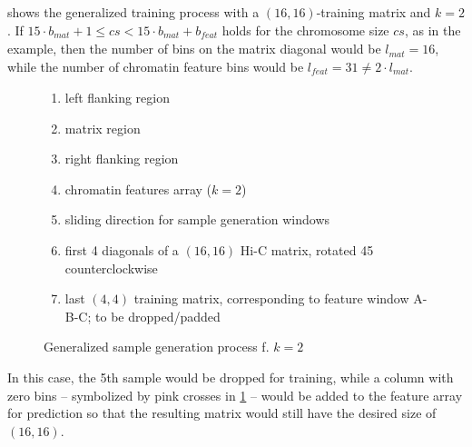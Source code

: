  shows the generalized training process with a $(16, 16)$-training matrix and $k=2$. 
If  $15\cdot b_\mathit{mat} + 1 \leq cs < 15\cdot b_\mathit{mat} + b_\mathit{feat}$ holds for the chromosome size $cs$, as in the example,
then the number of bins on the matrix diagonal would be $l_\mathit{mat}=16$, while the number of chromatin feature bins would be $l_\mathit{feat}=31 \not = 2 \cdot l_\mathit{mat}$.
\begin{figure}
 \begin{minipage}{0.65\textwidth}
    \caption{Generalized sample generation process f. $k=2$}
    \label{fig:methods:sample_gen_generalized}
 \end{minipage}\hfill
 \begin{minipage}{0.3\textwidth}
 \scriptsize
  \begin{enumerate}[label=\Alph*:,leftmargin=*]
   \raggedright
    \item left flanking region
    \item matrix region
    \item right flanking region
    \item chromatin features array ($k=2$)
    \item sliding direction for sample generation windows
    \item first 4 diagonals of a $(16, 16)$ Hi-C matrix, rotated \SI{45}{\deg} counterclockwise
    \item last $(4, 4)$ training matrix, corresponding to feature window A-B-C; to be dropped/padded
\end{enumerate}
 \end{minipage}
\end{figure}
In this case, the 5th sample would be dropped for training,
while a column with zero bins -- symbolized by pink crosses in \cref{fig:methods:sample_gen_generalized} -- would be added to the feature array for prediction
so that the resulting matrix would still have the desired size of $(16, 16)$.

